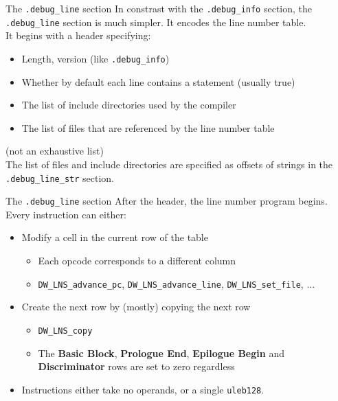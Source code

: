 \begin{frame}{The \texttt{.debug\_line} section}
In constrast with the \texttt{.debug\_info} section, the \texttt{.debug\_line} section
is much simpler. It encodes the \alert{line number table}.\\
\medskip
It begins with a header specifying:
\begin{itemize}
\item Length, version (like \texttt{.debug\_info})
\item Whether by default each line contains a statement (usually true)
\item The list of include directories used by the compiler
\item The list of files that are referenced by the line number table
\end{itemize}
(not an exhaustive list)\\
\medskip
The list of files and include directories are specified as offsets of strings in
the \texttt{.debug\_line\_str} section.
\end{frame}


\begin{frame}{The \texttt{.debug\_line} section}
After the header, the \alert{line number program} begins.\\
\medskip
Every instruction can either:
\begin{itemize}
\item Modify a cell in the current row of the table
	\begin{itemize}
	\item Each opcode corresponds to a different column
	\item \texttt{DW\_LNS\_advance\_pc}, \texttt{DW\_LNS\_advance\_line},
		\texttt{DW\_LNS\_set\_file}, ... 
	\end{itemize}
\item Create the next row by (mostly) copying the next row
	\begin{itemize}
	\item \texttt{DW\_LNS\_copy}
	\item The \textbf{Basic Block}, \textbf{Prologue End}, \textbf{Epilogue Begin} and \textbf{Discriminator} rows are set to zero regardless
	\end{itemize}
\medskip
\item Instructions either take no operands, or a single \texttt{uleb128}.
\end{itemize}
\end{frame}



